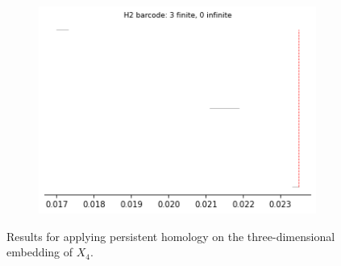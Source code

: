 \begin{figure}[H]
\begin{subfigure}[b]{0.24\textwidth}
\includegraphics[width=\textwidth]{figures/X4_H2_barcode.png}
 \caption{}
\end{subfigure}
\caption{Results for applying persistent homology on the three-dimensional embedding of $X_4$.}
\end{figure}

